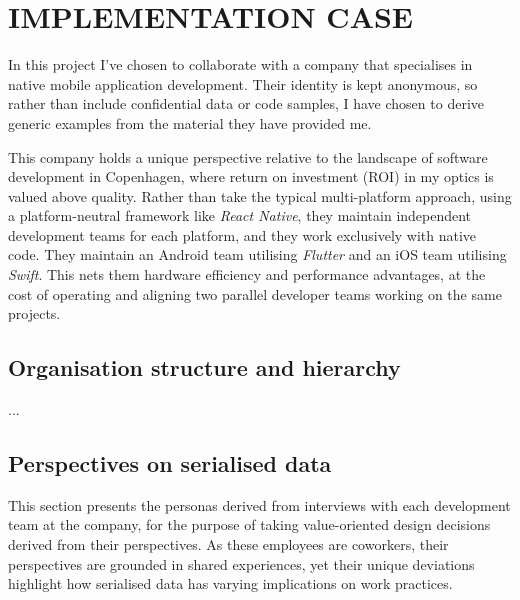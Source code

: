 \documentclass[../report.tex]{subfiles}
\begin{document}
\section{IMPLEMENTATION CASE} \label{sec:case}

In this project I've chosen to collaborate with a company that specialises in native mobile application development. Their identity is kept anonymous, so rather than include confidential data or code samples, I have chosen to derive generic examples from the material they have provided me.

This company holds a unique perspective relative to the landscape of software development in Copenhagen, where return on investment (ROI) in my optics is valued above quality. Rather than take the typical multi-platform approach, using a platform-neutral framework like \textit{React Native}, they maintain independent development teams for each platform, and they work exclusively with native code. They maintain an Android team utilising \textit{Flutter} and an iOS team utilising \textit{Swift}. This nets them hardware efficiency and performance advantages, at the cost of operating and aligning two parallel developer teams working on the same projects.

\subsection{Organisation structure and hierarchy}

...


\subsection{Perspectives on serialised data}

This section presents the personas derived from interviews with each development team at the company, for the purpose of taking value-oriented design decisions derived from their perspectives. As these employees are coworkers, their perspectives are grounded in shared experiences, yet their unique deviations highlight how serialised data has varying implications on work practices. \\
\end{document}
